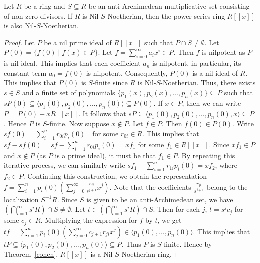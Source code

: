 \documentclass[11pt]{article}
\begin{document}
\begin{theorem} \label{Hilbert-2}
	Let $R$ be a ring and $S \subseteq R$ be an anti-Archimedean multiplicative set  consisting of non-zero divisors. If $R$ is Nil-$S$-Noetherian, then the power series ring $R[[x]]$ is also Nil-$S$-Noetherian.
\end{theorem}

\begin{proof}
Let $P$ be a nil prime ideal of $R[[x]]$ such that $P\cap S\neq\emptyset$.	 Let
	$ P(0) = \{f(0) \mid f(x) \in P\} $. 
	Let $f= \sum_{i=0}^{\infty}a_{i}x^{i} \in P$. Then $f$ is nilpotent as $P$ is nil ideal. This implies that each coefficient $a_{n}$ is nilpotent, in particular, its constant term $a_{0} = f(0)$ is nilpotent.
	Consequently, $P(0)$ is a nil ideal of $R$. This implies that $P(0)$ is $S$-finite since $R$ is Nil-$S$-Noetherian. Thus, there exists $s \in S$ and a finite set of polynomials $\{p_1(x), p_2(x), \dots, p_n(x)\} \subseteq P$ such that
	$ sP(0) \subseteq \langle p_1(0), p_2(0), \dots, p_n(0) \rangle \subseteq P(0) $.
	If $x \in P$, then we can write $P = P(0) + xR[[x]]$. It follows that
	 $sP \subseteq \langle p_1(0), p_2(0), \dots, p_n(0), x \rangle \subseteq P$.
	Hence $P$ is $S$-finite.
	 Now suppose  $x \notin P$.
	Let $f \in P$. Then $f(0) \in P(0)$. Write
	$ sf(0) = \sum_{i=1}^{n} r_{0i} p_i(0) \quad \text{for some } r_{0i} \in R$.
	This implies that
	$ sf -  sf(0) = sf- \sum_{i=1}^{n} r_{0i} p_i(0) = xf_1 $
	for some $f_1 \in R[[x]]$. Since $xf_1 \in P$ and $x \notin P$ (as $P$ is a prime ideal), it must be that $f_1 \in P$. 	
	By repeating this iterative process, we can similarly write
	$sf_1 - \sum_{i=1}^{n} r_{1i} p_i(0) = xf_2 $,
	where $f_2 \in P$. Continuing this construction, we obtain the representation
	$ f = \sum_{i=1}^{n} p_i(0) \left( \sum_{j=0}^{\infty} \frac{r_{ji}}{s^{j+1}} x^j \right) $.
	Note that the coefficients $\frac{r_{ji}}{s^{j+1}}$ belong to the localization $S^{-1}R$. Since $S$ is given to be an anti-Archimedean set, we have
	$ \left( \bigcap_{i=1}^{\infty} s^i R \right) \cap S \neq \emptyset $.
	Let $t \in \left( \bigcap_{i=1}^{\infty} s^i R \right) \cap S$. Then for each $j$, $t = s^j c_j$ for some $c_j \in R$. 
	Multiplying the expression for $f$ by $t$, we get
	$ tf = \sum_{i=1}^{n} p_i(0) \left( \sum_{j=0}^{\infty} c_{j+1} r_{ji} x^j \right) \in \langle p_1(0), \dots, p_n(0) \rangle $.
	This implies that
	$ tP \subseteq \langle p_1(0), p_2(0), \dots, p_n(0) \rangle \subseteq P$.
	Thus $P$ is $S$-finite. Hence by Theorem~\ref{cohen}, $R[[x]]$ is a Nil-$S$-Noetherian ring.
	
\end{proof}
\end{document}
